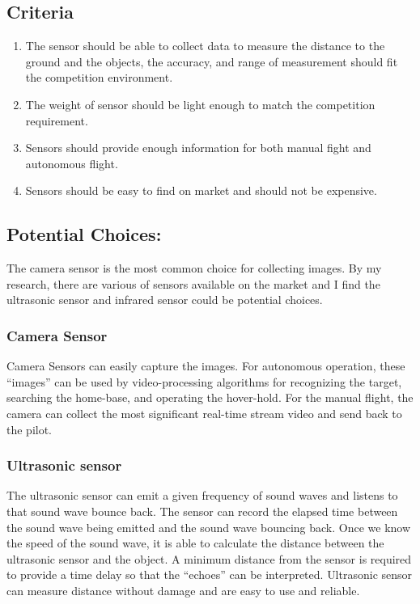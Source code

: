 \documentclass[letterpaper, 10, draftclsnofoot, onecolumn,compsoc]{IEEEtran}
\begin{document}
\subsection{Criteria}
\begin{enumerate}
\item{The sensor should be able to collect data to measure the distance to the ground and the objects, the accuracy, and range of measurement should fit the competition environment.}

\item{The weight of sensor should be light enough to match the competition requirement.}

\item{Sensors should provide enough information for both manual fight and autonomous flight.}

\item{Sensors should be easy to find on market and should not be expensive.}
\end{enumerate}


\subsection{Potential Choices:}
The camera sensor is the most common choice for collecting images. By my research, there are various of sensors available on the market and I find the ultrasonic sensor and infrared sensor could be potential choices.
\subsubsection{Camera Sensor}
Camera Sensors can easily capture the images. For autonomous operation, these “images” can be used by video-processing algorithms for recognizing the target, searching the home-base, and operating the hover-hold. For the manual flight, the camera can collect the most significant real-time stream video and send back to the pilot.

\subsubsection{Ultrasonic sensor}
The ultrasonic sensor can emit a given frequency of sound waves and listens to that sound wave bounce back. The sensor can record the elapsed time between the sound wave being emitted and the sound wave bouncing back. Once we know the speed of the sound wave, it is able to calculate the distance between the ultrasonic sensor and the object. A minimum distance from the sensor is required to provide a time delay so that the “echoes” can be interpreted. \cite{r1} Ultrasonic sensor can measure distance without damage and are easy to use and reliable. 
\end{document}
